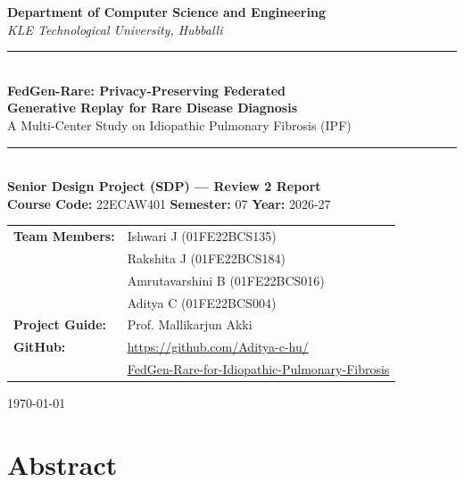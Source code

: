 \documentclass[12pt,a4paper]{report}
\begin{document}
\begin{titlepage}
    \centering
    \vspace{2cm}
    {\Large \textbf{Department of Computer Science and Engineering}}\\[0.4cm]
    {\large \textit{KLE Technological University, Hubballi}}\\[2cm]

    \rule{\linewidth}{0.5mm}\\[0.5cm]
    {\LARGE \bfseries FedGen-Rare: Privacy-Preserving Federated\\[0.3cm]
    Generative Replay for Rare Disease Diagnosis}\\[0.3cm]
    {\large A Multi-Center Study on Idiopathic Pulmonary Fibrosis (IPF)}\\[0.3cm]
    \rule{\linewidth}{0.5mm}\\[1.5cm]

    \textbf{Senior Design Project (SDP) — Review 2 Report}\\
    \textbf{Course Code:} 22ECAW401 \quad \textbf{Semester:} 07 \quad \textbf{Year:} 2026-27\\[2cm]

    \begin{tabular}{ll}
        \textbf{Team Members:} & Ishwari J (01FE22BCS135)\\
                               & Rakshita J (01FE22BCS184)\\
                               & Amrutavarshini B (01FE22BCS016)\\
                               & Aditya C (01FE22BCS004)\\[0.5cm]
        \textbf{Project Guide:} & Prof. Mallikarjun Akki\\[0.5cm]
        \textbf{GitHub:} & \url{https://github.com/Aditya-c-hu/}\\
                         & \url{FedGen-Rare-for-Idiopathic-Pulmonary-Fibrosis}
    \end{tabular}

    \vfill
    {\large \today}
\end{titlepage}

\tableofcontents
\listoffigures
\listoftables
\newpage

\chapter*{Abstract}
\end{document}
